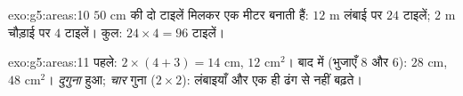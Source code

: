 \begin{solution}{exo:g5:areas:10}
$50$ cm की दो टाइलें मिलकर एक मीटर बनाती हैं: $12$ m लंबाई पर
$24$ टाइलें; $2$ m चौड़ाई पर $4$ टाइलें। कुल:
$24 \times 4 = 96$ टाइलें।
\end{solution}

\begin{solution}{exo:g5:areas:11}
पहले:  $2 \times (4 + 3) = 14$ cm,  $12$ cm$^2$।
बाद में (भुजाएँ $8$ और $6$):  $28$ cm,  $48$ cm$^2$।
 \emph{दुगुना} हुआ;  \emph{चार} गुना
($2 \times 2$): लंबाइयाँ और  एक ही ढंग से नहीं
बढ़ते।
\end{solution}
